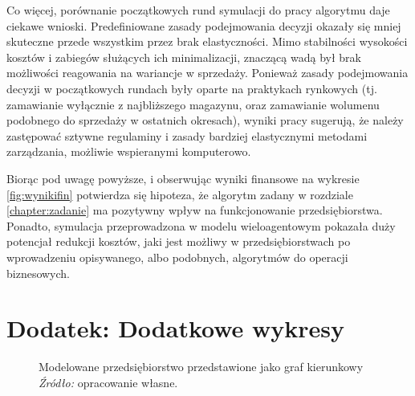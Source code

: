 \documentclass[polish, twoside, 12pt, a4paper]{article}
\theoremstyle{definition}
\theoremstyle{plain}
\theoremstyle{remark}
\begin{document}
Co więcej, porównanie początkowych rund symulacji do pracy algorytmu daje ciekawe wnioski. Predefiniowane zasady podejmowania decyzji okazały się mniej skuteczne przede wszystkim przez brak elastyczności. Mimo stabilności wysokości kosztów i zabiegów służących ich minimalizacji, znaczącą wadą był brak możliwości reagowania na wariancje w sprzedaży. Ponieważ zasady podejmowania decyzji w początkowych rundach były oparte na praktykach rynkowych (tj. zamawianie wyłącznie z najbliższego magazynu, oraz zamawianie wolumenu podobnego do sprzedaży w ostatnich okresach), wyniki pracy sugerują, że należy zastępować sztywne regulaminy i zasady bardziej elastycznymi metodami zarządzania, możliwie wspieranymi komputerowo.  

Biorąc pod uwagę powyższe,  i obserwując wyniki finansowe na wykresie \ref{fig:wynikifin} potwierdza się hipoteza, że algorytm zadany w rozdziale \ref{chapter:zadanie} ma pozytywny wpływ na funkcjonowanie przedsiębiorstwa. Ponadto, symulacja przeprowadzona w modelu wieloagentowym pokazała duży potencjał redukcji kosztów, jaki jest możliwy w przedsiębiorstwach po wprowadzeniu opisywanego, albo podobnych, algorytmów do operacji biznesowych.

\clearpage
\section{Dodatek: Dodatkowe wykresy}

\begin{figure}[hbt]
  \centering
\begin{center}
\end{center}
  \captionsetup{margin=10pt,font=small,labelfont=bf,width=.8\textwidth}
  \caption[Modelowane przedsiębiorstwo przedstawione jako graf kierunkowy]{Modelowane przedsiębiorstwo przedstawione jako graf kierunkowy  \textit{Źródło:} opracowanie własne.}\label{fig:prostygraf}
\end{figure}
\end{document}
